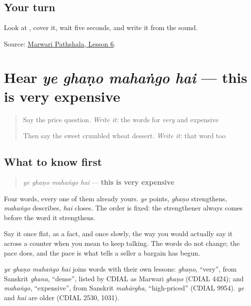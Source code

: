 \subsection*{Your turn}
Look at \textbf{}, cover it, wait five seconds, and write it from the sound.

\begin{tcolorbox}[breakable,colback=teal!4,colframe=teal!35!black,title={Before you move on}]
Source: \href{https://www.marwaripathshala.com/marwari-lesson-6-english}{Marwari Pathshala, Lesson 6}.
\end{tcolorbox}
\section[ye ghaṇo mahaṅgo hai]{Hear \emph{ye ghaṇo mahaṅgo hai} — this is very expensive}

\label{lesson:MW-C23-hear-price-answer}



\begin{quote}
Say the price question. \emph{Write it:} the words for \emph{very} and expensive

Then say the sweet crumbled wheat dessert. \emph{Write it:} that word too
\end{quote}

\subsection*{What to know first}
\begin{quote}
\emph{ye ghaṇo mahaṅgo hai} — \textbf{this is very expensive}
\end{quote}

Four words, every one of them already yours. \emph{ye} points, \emph{ghaṇo} strengthens, \emph{mahaṅgo} describes, \emph{hai} closes. The order is fixed: the strengthener always comes before the word it strengthens.

Say it once flat, as a fact, and once slowly, the way you would actually say it across a counter when you mean to keep talking. The words do not change; the pace does, and the pace is what tells a seller a bargain has begun.

\begin{cousinweb}
\emph{ye ghaṇo mahaṅgo hai} joins words with their own lessons: \emph{ghaṇo}, \textquotedblleft{}very\textquotedblright{}, from Sanskrit \emph{ghana}, \textquotedblleft{}dense\textquotedblright{}, listed by CDIAL as Marwari \emph{ghaṇo} (CDIAL 4424); and \emph{mahaṅgo}, \textquotedblleft{}expensive\textquotedblright{}, from Sanskrit \emph{mahārgha}, \textquotedblleft{}high-priced\textquotedblright{} (CDIAL 9954). \emph{ye} and \emph{hai} are older (CDIAL 2530, 1031).
\end{cousinweb}

